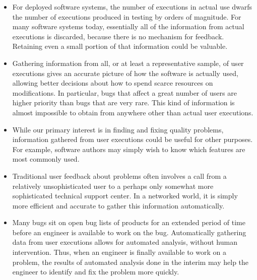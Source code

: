 \begin{itemize}

\item For deployed software systems, the number of executions
in actual use dwarfs the number of executions produced in testing by
orders of magnitude.  For many software systems today, essentially all
of the information from actual executions is discarded, because there
is no mechanism for feedback.  Retaining even a small portion of that
information could be valuable.

\item Gathering information from all, or at least a representative sample,
of user executions gives an accurate picture of how the software is
actually used, allowing better decisions about how to spend scarce
resources on modifications. In particular, bugs that affect a great
number of users are higher priority than bugs that are very rare.
This kind of information is almost impossible to obtain from anywhere
other than actual user executions.

\item While our primary interest is in finding and fixing quality
problems, information gathered from user executions could be useful
for other purposes.  For example, software authors may simply wish to
know which features are most commonly used.

\item Traditional user feedback about problems often involves a call 
from a relatively unsophisticated user to a perhaps only somewhat
more sophisticated technical support center.  In a networked world,
it is simply more efficient and accurate to gather this information
automatically.

\item Many bugs sit on open bug lists of products for an extended
period of time before an engineer is available to work on the bug.
Automatically gathering data from user executions allows for automated
analysis, without human intervention.  Thus, when an engineer is
finally available to work on a problem, the results of automated
analysis done in the interim may help the engineer to identify and fix
the problem more quickly.


\end{itemize}

